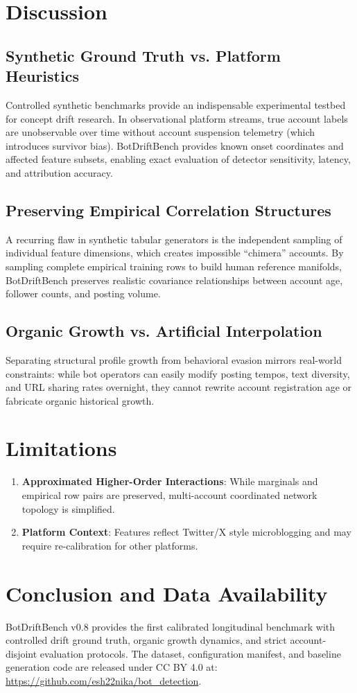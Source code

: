\documentclass[journal]{IEEEtran}
\begin{document}
\section{Discussion}
\subsection{Synthetic Ground Truth vs. Platform Heuristics}
Controlled synthetic benchmarks provide an indispensable experimental testbed for concept drift research. In observational platform streams, true account labels are unobservable over time without account suspension telemetry (which introduces survivor bias). BotDriftBench provides known onset coordinates and affected feature subsets, enabling exact evaluation of detector sensitivity, latency, and attribution accuracy.

\subsection{Preserving Empirical Correlation Structures}
A recurring flaw in synthetic tabular generators is the independent sampling of individual feature dimensions, which creates impossible ``chimera'' accounts. By sampling complete empirical training rows to build human reference manifolds, BotDriftBench preserves realistic covariance relationships between account age, follower counts, and posting volume.

\subsection{Organic Growth vs. Artificial Interpolation}
Separating structural profile growth from behavioral evasion mirrors real-world constraints: while bot operators can easily modify posting tempos, text diversity, and URL sharing rates overnight, they cannot rewrite account registration age or fabricate organic historical growth.

\section{Limitations}
\begin{enumerate}
    \item \textbf{Approximated Higher-Order Interactions}: While marginals and empirical row pairs are preserved, multi-account coordinated network topology is simplified.
    \item \textbf{Platform Context}: Features reflect Twitter/X style microblogging and may require re-calibration for other platforms.
\end{enumerate}

\section{Conclusion and Data Availability}
BotDriftBench v0.8 provides the first calibrated longitudinal benchmark with controlled drift ground truth, organic growth dynamics, and strict account-disjoint evaluation protocols. The dataset, configuration manifest, and baseline generation code are released under CC BY 4.0 at: \url{https://github.com/esh22nika/bot_detection}.



\end{document}
